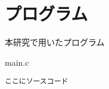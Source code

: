 \chapter{プログラム}
\thispagestyle{fancy}

本研究で用いたプログラム

main.c
\begin{lstlisting}
ここにソースコード
\end{lstlisting}